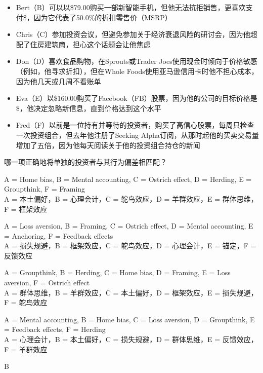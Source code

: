 \documentclass{article}
\newcommand{\dollar}{\ifmmode\text{\$}\else\$\fi}  %
\newcounter{question} %
\begin{document}
\begin{question}
\begin{itemize}
        \item Bert（B）可以以\dollar79.00购买一部新智能手机，但他无法抗拒销售，更喜欢支付\dollar100.00，因为它代表了50.0\%的折扣零售价（MSRP）
        \item Chris（C）参加投资会议，但避免参加关于经济衰退风险的研讨会，因为他超配了住房建筑商，担心这个话题会让他焦虑
        \item Don（D）喜欢食品购物，在Sprouts或Trader Joes使用现金时倾向于价格敏感（例如，他寻求折扣），但在Whole Foods使用亚马逊信用卡时他不担心成本，因为他几天或几周不看账单
        \item Eva（E）以\dollar160.00购买了Facebook（FB）股票，因为他的公司的目标价格是\dollar200.00，他决定忽略新信息，直到价格达到这个水平
        \item Fred（F）以前是一位持有并等待的投资者，购买了高信心股票，每周只检查一次投资组合，但去年他注册了Seeking Alpha订阅，从那时起他的买卖交易量增加了五倍，因为他每天阅读关于他的投资组合持仓的新闻
    \end{itemize}
    哪一项正确地将单独的投资者与其行为偏差相匹配？
\end{question}

\begin{choices}
    \item A = Home bias, B = Mental accounting, C = Ostrich effect, D = Herding, E = Groupthink, F = Framing
    \\A = 本土偏好，B = 心理会计，C = 鸵鸟效应，D = 羊群效应，E = 群体思维，F = 框架效应
    \item A = Loss aversion, B = Framing, C = Ostrich effect, D = Mental accounting, E = Anchoring, F = Feedback effects
    \\A = 损失规避，B = 框架效应，C = 鸵鸟效应，D = 心理会计，E = 锚定，F = 反馈效应
    \item A = Groupthink, B = Herding, C = Home bias, D = Framing, E = Loss aversion, F = Ostrich effect
    \\A = 群体思维，B = 羊群效应，C = 本土偏好，D = 框架效应，E = 损失规避，F = 鸵鸟效应
    \item A = Mental accounting, B = Home bias, C = Loss aversion, D = Groupthink, E = Feedback effects, F = Herding
    \\A = 心理会计，B = 本土偏好，C = 损失规避，D = 群体思维，E = 反馈效应，F = 羊群效应
\end{choices}

\begin{correctanswer}
    B
\end{correctanswer}
\end{document}
